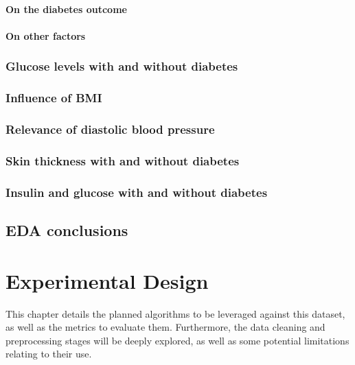 \documentclass[12pt]{report}
\begin{document}
\subsubsection{On the diabetes outcome} 

\subsubsection{On other factors}


\subsection{Glucose levels with and without diabetes}


\subsection{Influence of BMI}


\subsection{Relevance of diastolic blood pressure}


\subsection{Skin thickness with and without diabetes}


\subsection{Insulin and glucose with and without diabetes}





\section{EDA conclusions}


\chapter{Experimental Design} %
This chapter details the planned algorithms to be leveraged against this dataset,
as well as the metrics to evaluate them. Furthermore, the data cleaning and preprocessing 
stages will be deeply explored, as well as some potential limitations relating to their use.
\end{document}

